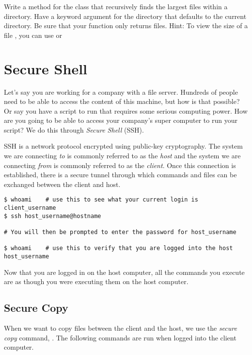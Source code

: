 \begin{problem}
Write a method for the  class that recursively finds the  largest files within a directory. Have a keyword argument for the directory that defaults to the current directory. Be sure that your function only returns files. Hint: To view the size of a file , you can use  or 
\end{problem}

\section*{Secure Shell}

Let's say you are working for a company with a file server. Hundreds of people need to be able to access the content of this machine, but how is that possible? Or say you have a script to run that requires some serious computing power. How are you going to be able to access your company's super computer to run your script? We do this through \emph{Secure Shell} (SSH).

SSH is a network protocol encrypted using public-key cryptography. The system we are connecting \emph{to} is commonly referred to as the \emph{host} and the system we are connecting \emph{from} is commonly referred to as the \emph{client}. Once this connection is established, there is a secure tunnel through which commands and files can be exchanged between the client and host.

\begin{lstlisting}
$ whoami    # use this to see what your current login is
client_username
$ ssh host_username@hostname

# You will then be prompted to enter the password for host_username

$ whoami    # use this to verify that you are logged into the host
host_username
\end{lstlisting}

Now that you are logged in on the host computer, all the commands you execute are as though you were executing them on the host computer.

\subsection*{Secure Copy}

When we want to copy files between the client and the host, we use the \emph{secure copy} command, . The following commands are run when logged into the client computer.

